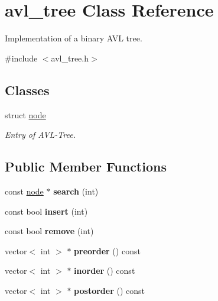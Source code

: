 \hypertarget{classavl__tree}{\section{avl\-\_\-tree Class Reference}
\label{classavl__tree}
}


Implementation of a binary A\-V\-L tree.  




{\ttfamily \#include $<$avl\-\_\-tree.\-h$>$}

\subsection*{Classes}
\begin{DoxyCompactItemize}
\item 
struct \hyperlink{structavl__tree_1_1node}{node}
\begin{DoxyCompactList}\small\item\em Entry of A\-V\-L-\/\-Tree. \end{DoxyCompactList}\end{DoxyCompactItemize}
\subsection*{Public Member Functions}
\begin{DoxyCompactItemize}
\item 
\hypertarget{classavl__tree_a7554d1333ab18cdb9472bdfab183bf28}{const \hyperlink{structavl__tree_1_1node}{node} $\ast$ {\bfseries search} (int)}\label{classavl__tree_a7554d1333ab18cdb9472bdfab183bf28}

\item 
\hypertarget{classavl__tree_a671d955359a56db67f09bc5dea32201a}{const bool {\bfseries insert} (int)}\label{classavl__tree_a671d955359a56db67f09bc5dea32201a}

\item 
\hypertarget{classavl__tree_a6ea8ac86887224e777c3531d5fa347f8}{const bool {\bfseries remove} (int)}\label{classavl__tree_a6ea8ac86887224e777c3531d5fa347f8}

\item 
\hypertarget{classavl__tree_a54d8bd6f3b5d23e9c6ed2ca3046e2f51}{vector$<$ int $>$ $\ast$ {\bfseries preorder} () const }\label{classavl__tree_a54d8bd6f3b5d23e9c6ed2ca3046e2f51}

\item 
\hypertarget{classavl__tree_a9c35affd0642ddd8fa6e1bea92e9dfb9}{vector$<$ int $>$ $\ast$ {\bfseries inorder} () const }\label{classavl__tree_a9c35affd0642ddd8fa6e1bea92e9dfb9}

\item 
\hypertarget{classavl__tree_a153a69d4bfe9952ec59c18c76cb5932d}{vector$<$ int $>$ $\ast$ {\bfseries postorder} () const }\label{classavl__tree_a153a69d4bfe9952ec59c18c76cb5932d}

\end{DoxyCompactItemize}


